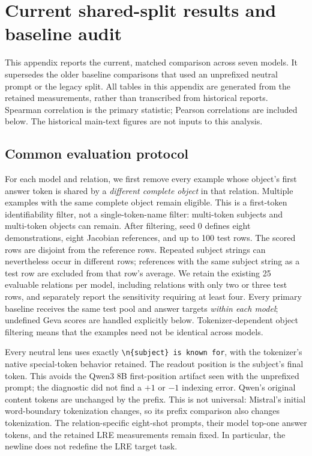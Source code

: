 \section{Current shared-split results and baseline audit}
\label{sec:shared-baselines}

This appendix reports the current, matched comparison across seven models.
It supersedes the older baseline comparisons that used an unprefixed neutral
prompt or the legacy split. All tables in this appendix are generated from
the retained measurements, rather than transcribed from historical reports.
Spearman correlation is the primary statistic; Pearson correlations are
included below. The historical main-text figures are not inputs to this analysis.

\subsection{Common evaluation protocol}

For each model and relation, we first remove every example whose object's
first answer token is shared by a \emph{different complete object} in that
relation. Multiple examples with the same complete object remain eligible.
This is a first-token identifiability filter, not a single-token-name filter:
multi-token subjects and multi-token objects can remain. After filtering,
seed 0 defines eight demonstrations, eight Jacobian references, and up to
100 test rows. The scored rows are disjoint from the reference rows.
Repeated subject strings can nevertheless occur in different rows; references
with the same subject string as a test row are excluded from that row's average.
We retain the existing 25 evaluable relations per model, including relations
with only two or three test rows, and separately report the sensitivity
requiring at least four. Every primary baseline receives the same test pool
and answer targets \emph{within each model}; undefined Geva scores are
handled explicitly below. Tokenizer-dependent object
filtering means that the examples need not be identical across models.

Every neutral lens uses exactly \texttt{\textbackslash n\{subject\} is known for},
with the tokenizer's native special-token behavior retained. The readout
position is the subject's final token. This avoids the Qwen3 8B first-position
artifact seen with the unprefixed prompt; the diagnostic did not find a
$+1$ or $-1$ indexing error. Qwen's original content tokens are unchanged by
the prefix. This is not universal: Mistral's initial word-boundary tokenization
changes, so its prefix comparison also changes tokenization. The
relation-specific eight-shot prompts, their model top-one answer tokens,
and the retained LRE measurements remain fixed. In particular, the newline
does not redefine the LRE target task.


